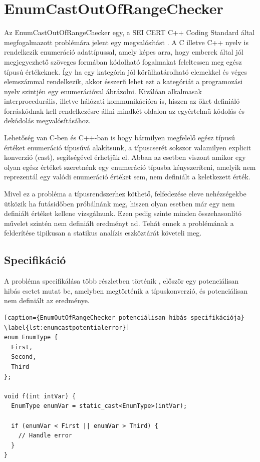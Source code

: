 \documentclass[a4paper,12pt]{report}
\begin{document}
\section{EnumCastOutOfRangeChecker}
Az EnumCastOutOfRangeChecker egy, a SEI CERT C++ Coding Standard által megfogalmazott problémára jelent egy megvalósítást \cite{securecodingint50}.
A C illetve C++ nyelv is rendelkezik enumeráció adattípussal, amely képes arra, hogy emberek által jól megjegyezhető szöveges formában kódolható fogalmakat feleltessen meg egész típusú értékeknek. Így ha egy kategória jól körülhatárolható elemekkel és véges elemszámmal rendelkezik, akkor ésszerű lehet ezt a kategóriát a programozási nyelv szintjén egy enumerációval ábrázolni. Kiválóan alkalmasak interprocedurális, illetve hálózati kommunikációra is, hiszen az őket definiáló forráskódnak kell rendelkezésre állni mindkét oldalon az egyértelmű kódolás és dekódolás megvalósításához.

Lehetőség van C-ben és C++-ban is hogy bármilyen megfelelő egész típusú értéket enumeráció típusúvá alakítsunk, a típuscserét sokszor valamilyen explicit konverzió (cast), segítségével érhetjük el. Abban az esetben viszont amikor egy olyan egész értéket szeretnénk egy enumeráció típusba kényszeríteni, amelyik nem reprezentál egy valódi enumeráció értéket sem, nem definiált a keletkezett érték.

Mivel ez a probléma a típusrendszerhez köthető, felfedezése eleve nehézségekbe ütközik ha futásidőben próbálnánk meg, hiszen olyan esetben már egy nem definiált értéket kellene vizsgálnunk. Ezen pedig szinte minden összehasonlító művelet szintén nem definiált eredményt ad. Tehát ennek a problémának a felderítése tipikusan a statikus analízis eszköztárát követeli meg.


\subsection{Specifikáció}
A probléma specifikálása több részletben történik \cite{securecodingint50}, először egy potenciálisan hibás esetet mutat be, amelyben megtörténik a típuskonverzió, és potenciálisan nem definiált az eredménye.

\begin{lstlisting}[caption={EnumOutOfRangeChecker potenciálisan hibás specifikációja}
\label{lst:enumcastpotentialerror}]
enum EnumType {
  First,
  Second,
  Third
};
 
void f(int intVar) {
  EnumType enumVar = static_cast<EnumType>(intVar);
 
  if (enumVar < First || enumVar > Third) {
    // Handle error
  }
}
\end{lstlisting}
\end{document}
